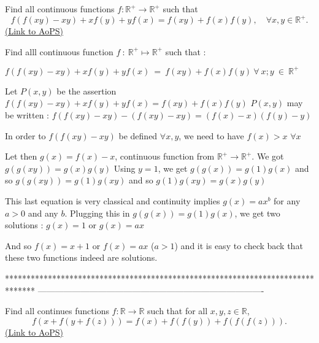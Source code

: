 \begin{problem}
	Find all continuous functions $ f : \mathbb{R^+} \to\mathbb{R^+}$ such that
\[ f( f(xy) - xy ) + xf(y) + yf(x)  = f(xy) + f(x)f(y), \quad \forall x,y   \in  \mathbb{R^+}.\]
	\flushright \href{https://artofproblemsolving.com/community/c6h314979}{(Link to AoPS)}
\end{problem}



\begin{solution}
	\begin{tcolorbox}\begin{italicized}Find alll continuous function $ f \ : \ \mathbb{R^ + } \mapsto \mathbb{R^ + }$ such that :

        $ f( f(xy) - xy ) + xf(y) + yf(x) \ = \ f(xy) + f(x)f(y) \ \forall \ x;y \ \in \ \mathbb{R^ + }$\end{italicized}\end{tcolorbox}

Let $ P(x,y)$ be the assertion $ f(f(xy)-xy)+xf(y)+yf(x)=f(xy)+f(x)f(y)$
$ P(x,y)$ may be written : $ f(f(xy)-xy)-(f(xy)-xy)=(f(x)-x)(f(y)-y)$

In order to $ f(f(xy)-xy)$ be defined $ \forall x,y$, we need to have $ f(x)>x$ $ \forall x$

Let then $ g(x)=f(x)-x$, continuous function from $ \mathbb R^+\to\mathbb R^+$. We got $ g(g(xy))=g(x)g(y)$
Using $ y=1$, we get $ g(g(x))=g(1)g(x)$ and so $ g(g(xy))=g(1)g(xy)$ and so $ g(1)g(xy)=g(x)g(y)$

This last equation is very classical and continuity implies $ g(x)=ax^b$ for any $ a>0$ and any $ b$. Plugging this in $ g(g(x))=g(1)g(x)$, we get two solutions : $ g(x)=1$ or $ g(x)=ax$

And so $ \boxed{f(x)=x+1}$ or $ \boxed{f(x)=ax}$ ($ a>1$) and it is easy to check back that these two functions indeed are solutions.
\end{solution}
*******************************************************************************
-------------------------------------------------------------------------------

\begin{problem}
	Find all continues functions $ f: \mathbb R\to\mathbb R$ such that for all $ x,y,z\in\mathbb R$,
\[f(x+f(y+f(z)))=f(x)+f(f(y))+f(f(f(z))).\]
	\flushright \href{https://artofproblemsolving.com/community/c6h315246}{(Link to AoPS)}
\end{problem}



